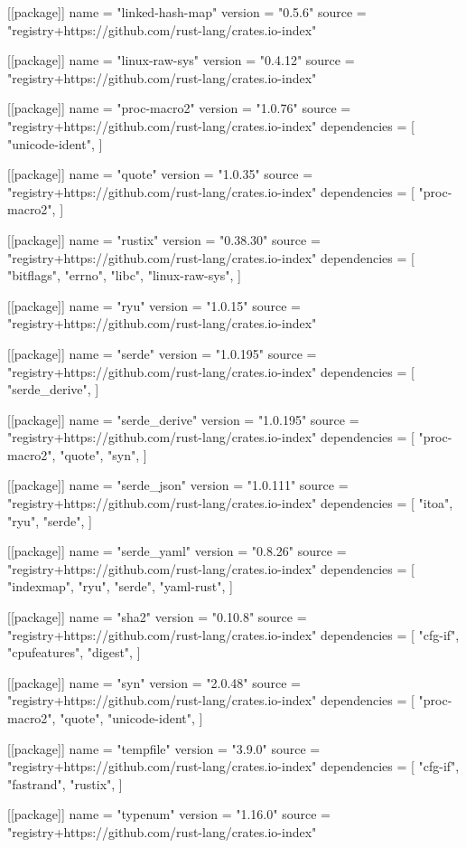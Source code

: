 [[package]]
name = "linked-hash-map"
version = "0.5.6"
source = "registry+https://github.com/rust-lang/crates.io-index"

[[package]]
name = "linux-raw-sys"
version = "0.4.12"
source = "registry+https://github.com/rust-lang/crates.io-index"

[[package]]
name = "proc-macro2"
version = "1.0.76"
source = "registry+https://github.com/rust-lang/crates.io-index"
dependencies = [
 "unicode-ident",
]

[[package]]
name = "quote"
version = "1.0.35"
source = "registry+https://github.com/rust-lang/crates.io-index"
dependencies = [
 "proc-macro2",
]

[[package]]
name = "rustix"
version = "0.38.30"
source = "registry+https://github.com/rust-lang/crates.io-index"
dependencies = [
 "bitflags",
 "errno",
 "libc",
 "linux-raw-sys",
]

[[package]]
name = "ryu"
version = "1.0.15"
source = "registry+https://github.com/rust-lang/crates.io-index"

[[package]]
name = "serde"
version = "1.0.195"
source = "registry+https://github.com/rust-lang/crates.io-index"
dependencies = [
 "serde_derive",
]

[[package]]
name = "serde_derive"
version = "1.0.195"
source = "registry+https://github.com/rust-lang/crates.io-index"
dependencies = [
 "proc-macro2",
 "quote",
 "syn",
]

[[package]]
name = "serde_json"
version = "1.0.111"
source = "registry+https://github.com/rust-lang/crates.io-index"
dependencies = [
 "itoa",
 "ryu",
 "serde",
]

[[package]]
name = "serde_yaml"
version = "0.8.26"
source = "registry+https://github.com/rust-lang/crates.io-index"
dependencies = [
 "indexmap",
 "ryu",
 "serde",
 "yaml-rust",
]

[[package]]
name = "sha2"
version = "0.10.8"
source = "registry+https://github.com/rust-lang/crates.io-index"
dependencies = [
 "cfg-if",
 "cpufeatures",
 "digest",
]

[[package]]
name = "syn"
version = "2.0.48"
source = "registry+https://github.com/rust-lang/crates.io-index"
dependencies = [
 "proc-macro2",
 "quote",
 "unicode-ident",
]

[[package]]
name = "tempfile"
version = "3.9.0"
source = "registry+https://github.com/rust-lang/crates.io-index"
dependencies = [
 "cfg-if",
 "fastrand",
 "rustix",
]

[[package]]
name = "typenum"
version = "1.16.0"
source = "registry+https://github.com/rust-lang/crates.io-index"

